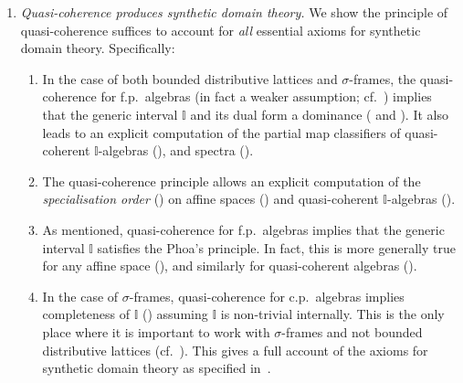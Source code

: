 \documentclass[a4paper,12pt]{amsart}
\theoremstyle{definition}
\newcommand{\mbb}[1]{\mathbb{#1}}
\newcommand{\I}{\mbb I}
\begin{document}
\begin{enumerate}[leftmargin=*]
  \item \emph{Quasi-coherence produces synthetic domain theory.} We show the principle of quasi-coherence suffices to account for \emph{all} essential axioms for synthetic domain theory. Specifically:
  \begin{enumerate}
    \item\label{contribution:dominance} In the case of both bounded distributive lattices and $\sigma$-frames, the quasi-coherence for f.p.\ algebras (in fact a weaker assumption; cf.\ ) implies that the generic interval $\I$ and its dual form a dominance ( and ). It also leads to an explicit computation of the partial map classifiers of quasi-coherent $\I$-algebras (), and spectra ().
    \item The quasi-coherence principle allows an explicit computation of the \emph{specialisation order} () on affine spaces () and quasi-coherent $\I$-algebras ().
    \item As mentioned, quasi-coherence for f.p.\ algebras implies that the generic interval $\I$ satisfies the Phoa's principle. In fact, this is more generally true for any affine space (), and similarly for quasi-coherent algebras ().
    \item In the case of $\sigma$-frames, quasi-coherence for c.p.\ algebras implies completeness of $\I$ () assuming $\I$ is non-trivial internally. 
    This is the only place where it is important to work with $\sigma$-frames and not bounded distributive lattices (cf.~). This gives a full account of the axioms for synthetic domain theory as specified in~\cite{hyland1990first}. 
  \end{enumerate}


\end{enumerate}
\end{document}
